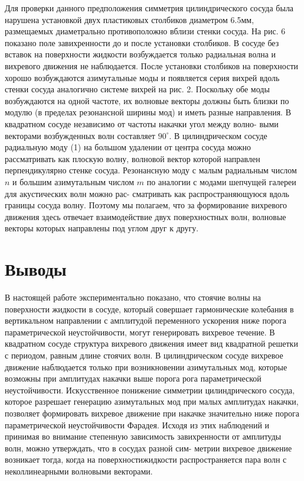 Для проверки данного предположения симметрия цилиндрического сосуда была нарушена установкой двух пластиковых столбиков диаметром 6.5мм, размещаемых диаметрально противоположно вблизи стенки сосуда. На рис. 6 показано поле завихренности до и после установки столбиков. В сосуде без вставок на поверхности жидкости возбуждается только радиальная волна и вихревого движения не наблюдается. После установки столбиков на поверхности хорошо возбуждаются азимутальные моды и появляется серия вихрей вдоль стенки сосуда аналогично системе вихрей на рис. 2. Поскольку обе моды возбуждаются на одной частоте, их волновые векторы должны быть близки по модулю (в пределах резонансной ширины мод) и иметь разные направления. В квадратном сосуде независимо от частоты накачки угол между волно- выми векторами возбужденных волн составляет $90^\circ$. В цилиндрическом сосуде радиальную моду (1) на большом удалении от центра сосуда можно рассматривать как плоскую волну, волновой вектор которой направлен перпендикулярно стенке сосуда. Резонансную моду с малым радиальным числом $n$ и большим азимутальным числом $m$ по аналогии с модами шепчущей галереи для акустических волн можно рас- сматривать как распространяющуюся вдоль границы сосуда волну. Поэтому мы полагаем, что за формирование вихревого движения здесь отвечает взаимодействие двух поверхностных волн, волновые векторы которых направлены под углом друг к другу.
\section{Выводы} \label{sect3_3}
В настоящей работе экспериментально показано, что стоячие волны на поверхности жидкости в сосуде, который совершает гармонические колебания в вертикальном направлении с амплитудой переменного ускорения ниже порога параметрической неустойчивости, могут генерировать вихревое течение. В квадратном сосуде структура вихревого движения имеет вид квадратной решетки с периодом, равным длине стоячих волн. В цилиндрическом сосуде вихревое движение наблюдается только при возникновении азимутальных мод, которые возможны при амплитудах накачки выше порога рога параметрической неустойчивости. Искусственное понижение симметрии цилиндрического сосуда, которое разрешает генерацию азимутальных мод при малых амплитудах накачки, позволяет формировать вихревое движение при накачке значительно ниже порога параметрической неустойчивости Фарадея. Исходя из этих наблюдений и принимая во внимание степенную зависимость завихренности от амплитуды волн, можно утверждать, что в сосудах разной сим- метрии вихревое движение возникает тогда, когда на поверхностижидкости распространяется пара волн с неколлинеарными волновыми векторами.

